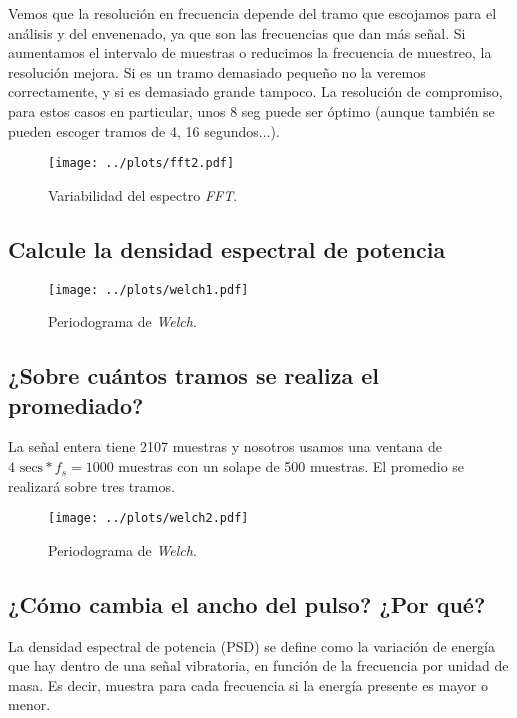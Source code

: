 \documentclass{article}
\begin{document}
Vemos que la resolución en frecuencia depende del tramo que escojamos
para el análisis y del envenenado, ya que son las frecuencias que dan
más señal. Si aumentamos el intervalo de muestras o reducimos la
frecuencia de muestreo, la resolución mejora. Si es un tramo demasiado
pequeño no la veremos correctamente, y si es demasiado grande tampoco.
La resolución de compromiso, para estos casos en particular, unos 8
seg puede ser óptimo (aunque también se pueden escoger tramos de  4,
16 segundos...).

\vfill
\begin{figure}[h]
\centering
\texttt{[image: ../plots/fft2.pdf]}
\vspace{-1.5cm}
\caption{Variabilidad del espectro \textit{FFT}.}
\label{fig:LABEL_NAME}
\end{figure}
\vfill
\newpage

\subsection{Calcule la densidad espectral de potencia}

\begin{figure}[h]
\centering
\texttt{[image: ../plots/welch1.pdf]}
\vspace{-1cm}
\caption{Periodograma de \textit{Welch}.}
\label{fig:welch}
\end{figure}


\vfill
\subsection{¿Sobre cuántos tramos se realiza el promediado?}

La señal entera tiene 2107 muestras y nosotros usamos una ventana de
$4 \text{ secs} * f_{s} = 1000$ muestras con un solape de 500 muestras.
El promedio se realizará sobre tres tramos.

\begin{figure}[h]
\centering
\texttt{[image: ../plots/welch2.pdf]}
\vspace{-1cm}
\caption{Periodograma de \textit{Welch}.}
\label{fig:welch}
\end{figure}

\subsection{¿Cómo cambia el ancho del pulso? ¿Por qué?}

La densidad espectral de potencia (PSD) se define como la variación de
energía que hay dentro de una señal vibratoria, en función de la
frecuencia por unidad de masa. Es decir, muestra para cada frecuencia
si la energía presente es mayor o menor.
\end{document}
